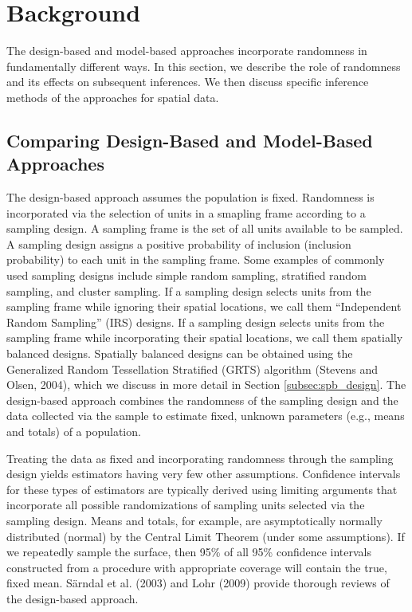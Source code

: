 \documentclass[]{elsarticle} %
\begin{document}
\hypertarget{sec:background}{%
\section{Background}\label{sec:background}}

The design-based and model-based approaches incorporate randomness in
fundamentally different ways. In this section, we describe the role of
randomness and its effects on subsequent inferences. We then discuss
specific inference methods of the approaches for spatial data.

\hypertarget{subsec:dvm_compare}{%
\subsection{Comparing Design-Based and Model-Based
Approaches}\label{subsec:dvm_compare}}

The design-based approach assumes the population is fixed. Randomness is
incorporated via the selection of units in a smapling frame according to
a sampling design. A sampling frame is the set of all units available to
be sampled. A sampling design assigns a positive probability of
inclusion (inclusion probability) to each unit in the sampling frame.
Some examples of commonly used sampling designs include simple random
sampling, stratified random sampling, and cluster sampling. If a
sampling design selects units from the sampling frame while ignoring
their spatial locations, we call them ``Independent Random Sampling''
(IRS) designs. If a sampling design selects units from the sampling
frame while incorporating their spatial locations, we call them
spatially balanced designs. Spatially balanced designs can be obtained
using the Generalized Random Tessellation Stratified (GRTS) algorithm
(Stevens and Olsen, 2004), which we discuss in more detail in Section
\ref{subsec:spb_design}. The design-based approach combines the
randomness of the sampling design and the data collected via the sample
to estimate fixed, unknown parameters (e.g., means and totals) of a
population.

Treating the data as fixed and incorporating randomness through the
sampling design yields estimators having very few other assumptions.
Confidence intervals for these types of estimators are typically derived
using limiting arguments that incorporate all possible randomizations of
sampling units selected via the sampling design. Means and totals, for
example, are asymptotically normally distributed (normal) by the Central
Limit Theorem (under some assumptions). If we repeatedly sample the
surface, then 95\% of all 95\% confidence intervals constructed from a
procedure with appropriate coverage will contain the true, fixed mean.
Särndal et al. (2003) and Lohr (2009) provide thorough reviews of the
design-based approach.
\end{document}

